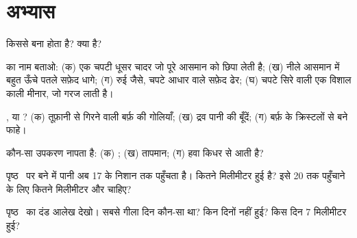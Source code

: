 \section{अभ्यास}

\begin{exercise}[$\star$]\label{exo:g4:clouds-rain-snow:1}
 किससे बना होता है?  क्या है?
\end{exercise}

\begin{exercise}[$\star$]\label{exo:g4:clouds-rain-snow:2}
 का नाम बताओ: (क) एक चपटी धूसर चादर जो पूरे आसमान को छिपा लेती है;
(ख) नीले आसमान में बहुत ऊँचे पतले सफ़ेद धागे; (ग) रुई जैसे, चपटे आधार वाले सफ़ेद
ढेर; (घ) चपटे सिरे वाली एक विशाल काली मीनार, जो गरज लाती है।
\end{exercise}

\begin{exercise}[$\star$]\label{exo:g4:clouds-rain-snow:3}
,  या ? (क) तूफ़ानी  से गिरने वाली बर्फ़ की गोलियाँ; (ख) द्रव
पानी की बूँदें; (ग) बर्फ़ के क्रिस्टलों से बने फाहे।
\end{exercise}

\begin{exercise}[$\star$]\label{exo:g4:clouds-rain-snow:4}
कौन-सा उपकरण नापता है: (क) ; (ख) तापमान; (ग) हवा किधर से आती है?
\end{exercise}

\begin{exercise}[$\star$]\label{exo:g4:clouds-rain-snow:5}
पृष्ठ~\pageref{fig:g4:clouds-rain-snow:gauge} पर बने  में पानी अब 17 के
निशान तक पहुँचता है। कितने मिलीमीटर  हुई है? इसे 20 तक पहुँचाने के लिए
कितने मिलीमीटर और चाहिए?
\end{exercise}

\begin{exercise}[$\star$]\label{exo:g4:clouds-rain-snow:6}
पृष्ठ~\pageref{fig:g4:clouds-rain-snow:bars} का दंड आलेख देखो। सबसे गीला दिन
कौन-सा था? किन दिनों  नहीं हुई? किस दिन 7 मिलीमीटर  हुई?
\end{exercise}

